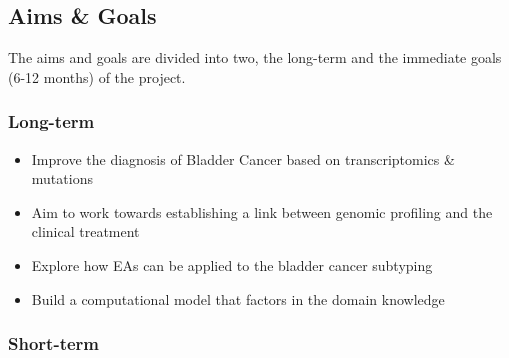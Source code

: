 



\subsection{Aims \& Goals} \label{s:aims}

The aims and goals are divided into two, the long-term and the immediate goals (6-12 months) of the project.

\subsubsection*{Long-term}
\begin{itemize} 
    \item Improve the diagnosis of Bladder Cancer based on transcriptomics \& mutations 
    \item Aim to work towards establishing a link between genomic profiling and the clinical treatment 
    \item Explore how EAs can be applied to the bladder cancer subtyping 
    \item Build a computational model that factors in the domain knowledge
\end{itemize}


\subsubsection*{Short-term}

